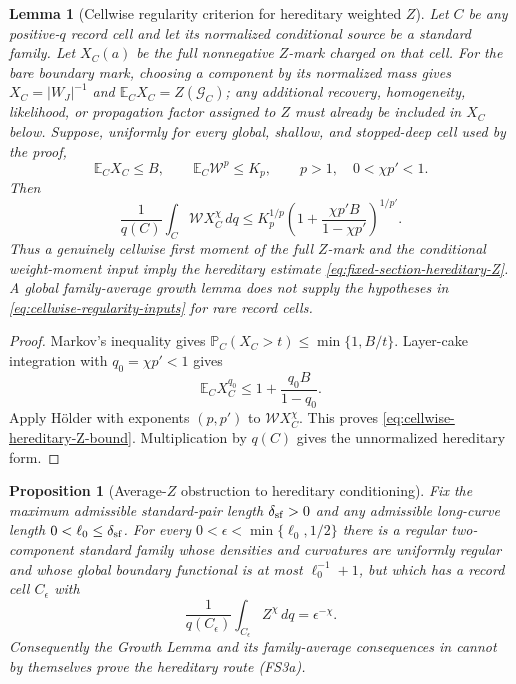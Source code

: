 \documentclass[11pt]{article}
\newtheorem{proposition}[theorem]{Proposition}
\newtheorem{lemma}[theorem]{Lemma}
\begin{document}
\begin{lemma}[Cellwise regularity criterion for hereditary weighted $Z$]
\label{lem:cellwise-regularity-hereditary-Z}
Let $C$ be any positive-$q$ record cell and let its normalized conditional
source be a standard family.  Let $X_C(a)$ be the full nonnegative $Z$-mark
charged on that cell.  For the bare boundary mark, choosing a component by
its normalized mass gives $X_C=|W_J|^{-1}$ and
$\mathbb E_CX_C=Z(\mathcal G_C)$; any additional recovery, homogeneity,
likelihood, or propagation factor assigned to $Z$ must already be included
in $X_C$ below.  Suppose, uniformly for every global, shallow, and
stopped-deep cell used by the proof,
\begin{equation}
\label{eq:cellwise-regularity-inputs}
 \mathbb E_C X_C\le B,
 \qquad
 \mathbb E_C\mathscr W^p\le K_p,
 \qquad p>1,\quad 0<\chi p'<1.
\end{equation}
Then
\begin{equation}
\label{eq:cellwise-hereditary-Z-bound}
 \frac1{q(C)}\int_C\mathscr W X_C^\chi\,dq
 \le K_p^{1/p}
 \left(1+\frac{\chi p'B}{1-\chi p'}\right)^{1/p'}.
\end{equation}
Thus a genuinely cellwise first moment of the full $Z$-mark and the
conditional weight-moment input imply the hereditary estimate
\eqref{eq:fixed-section-hereditary-Z}.  A global family-average growth lemma
does not supply the hypotheses in
\eqref{eq:cellwise-regularity-inputs} for rare record cells.
\end{lemma}

\begin{proof}
Markov's inequality gives
$\mathbb P_C(X_C>t)\le\min\{1,B/t\}$.  Layer-cake integration with
$q_0=\chi p'<1$ gives
\[
 \mathbb E_CX_C^{q_0}
 \le1+\frac{q_0B}{1-q_0}.
\]
Apply H\"older with exponents $(p,p')$ to
$\mathscr W X_C^\chi$.  This proves
\eqref{eq:cellwise-hereditary-Z-bound}.  Multiplication by $q(C)$ gives the
unnormalized hereditary form.
\end{proof}

\begin{proposition}[Average-$Z$ obstruction to hereditary conditioning]
\label{prop:average-Z-not-hereditary}
Fix the maximum admissible standard-pair length $\delta_{\rm sf}>0$ and any
admissible long-curve length $0<\ell_0\le\delta_{\rm sf}$.  For every
$0<\epsilon<\min\{\ell_0,1/2\}$ there is a regular two-component standard
family whose densities and curvatures are uniformly regular and whose global
boundary functional is at most $\ell_0^{-1}+1$, but which has a record cell
$C_\epsilon$
with
\begin{equation}
\label{eq:average-Z-hereditary-countermodel}
 \frac1{q(C_\epsilon)}
 \int_{C_\epsilon}Z^\chi\,dq=\epsilon^{-\chi}.
\end{equation}
Consequently the Growth Lemma and its family-average consequences in
\cite[Lemma~6.14 and Corollary~6.15]{CanestrariHoles} cannot by themselves
prove the hereditary route \textup{(FS3a)}.
\end{proposition}
\end{document}
